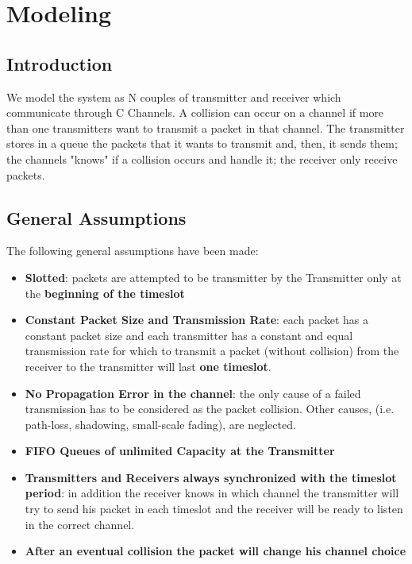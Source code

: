 \section{Modeling}
\subsection{Introduction}
We model the system as N couples of transmitter and receiver which communicate through C Channels. A collision can occur on a channel if more than one transmitters want to transmit a packet in that channel. The transmitter stores in a queue the packets that it wants to transmit and, then, it sends them; the channels "knows" if a collision occurs and handle it; the receiver only receive packets.  
\subsection{General Assumptions}
The following general assumptions have been made:
\begin{itemize}
	\item \textbf{Slotted}: packets are attempted to be transmitter by the Transmitter only at the \textbf{beginning of the timeslot}
	\item \textbf{Constant Packet Size and Transmission Rate}: each packet has a constant packet size and each transmitter has a constant and equal transmission rate for which to transmit a packet (without collision) from the receiver to the transmitter will last \textbf{one timeslot}.
	\item \textbf{No Propagation Error in the channel}: the only cause of a failed transmission has to be considered as the packet collision. Other causes, (i.e. path-loss, shadowing, small-scale fading), are neglected. 
	\item \textbf{FIFO Queues of unlimited Capacity at the Transmitter} 
	\item \textbf{Transmitters and Receivers always synchronized with the timeslot period}: in addition the receiver knows in which channel the transmitter will try to send his packet in each timeslot and the receiver will be ready to listen in the correct channel.
	\item \textbf{After an eventual collision the packet will change his channel choice}
\end{itemize}


